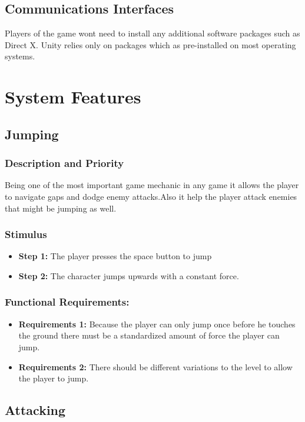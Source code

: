 \section{Communications Interfaces}
Players of the game wont need to install any additional software packages such as Direct X. Unity relies only on packages which as pre-installed on most operating systems.

\chapter{System Features}
\label{System Features}

\section{Jumping}
\subsection{Description and Priority}
Being one of the most important game mechanic in any game it allows the player to navigate gaps and dodge enemy attacks.Also it help the player attack enemies that might be jumping as well.
\subsection{Stimulus}
\begin{itemize}
    \item \textbf{Step 1:} The player presses the space button to jump
    \item \textbf{Step 2:} The character jumps upwards with a constant force.
\end{itemize}
\subsection{Functional Requirements:}
\begin{itemize}
    \item \textbf{Requirements 1:} Because the player can only jump once before he touches the ground there must be a standardized amount of force the player can jump.
    \item \textbf{Requirements 2:} There should be different variations to the level to allow the player to jump.
\end{itemize}

\section{Attacking}
